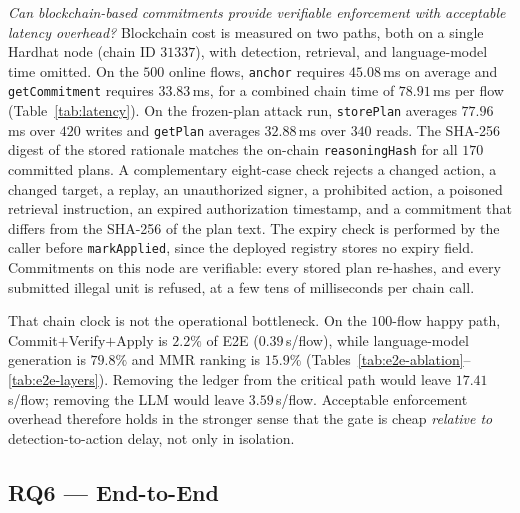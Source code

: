 \documentclass[10pt, conference]{IEEEtran}
\begin{document}
\textit{Can blockchain-based commitments provide verifiable enforcement with acceptable latency overhead?}
Blockchain cost is measured on two paths, both on a single Hardhat node (chain ID $31337$), with detection, retrieval, and language-model time omitted. On the $500$ online flows, \texttt{anchor} requires $45.08$\,ms on average and \texttt{getCommitment} requires $33.83$\,ms, for a combined chain time of $78.91$\,ms per flow (Table~\ref{tab:latency}). On the frozen-plan attack run, \texttt{storePlan} averages $77.96$\,ms over $420$ writes and \texttt{getPlan} averages $32.88$\,ms over $340$ reads. The SHA-256 digest of the stored rationale matches the on-chain \texttt{reasoningHash} for all $170$ committed plans. A complementary eight-case check rejects a changed action, a changed target, a replay, an unauthorized signer, a prohibited action, a poisoned retrieval instruction, an expired authorization timestamp, and a commitment that differs from the SHA-256 of the plan text. The expiry check is performed by the caller before \texttt{markApplied}, since the deployed registry stores no expiry field. Commitments on this node are verifiable: every stored plan re-hashes, and every submitted illegal unit is refused, at a few tens of milliseconds per chain call.

That chain clock is not the operational bottleneck. On the $100$-flow happy path, Commit$+$Verify$+$Apply is $2.2\%$ of E2E ($0.39$\,s/flow), while language-model generation is $79.8\%$ and MMR ranking is $15.9\%$ (Tables~\ref{tab:e2e-ablation}--\ref{tab:e2e-layers}). Removing the ledger from the critical path would leave $17.41$\,s/flow; removing the LLM would leave $3.59$\,s/flow. Acceptable enforcement overhead therefore holds in the stronger sense that the gate is cheap \emph{relative to} detection-to-action delay, not only in isolation.

\subsection{RQ6 --- End-to-End}
\label{sec:rq6}
\end{document}
